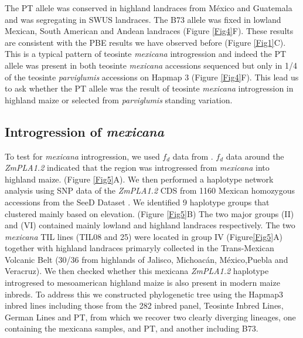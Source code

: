 \documentclass[9pt,twocolumn,twoside,lineno]{BioRxiv}
\begin{document}
The PT allele was conserved in highland landraces from México and Guatemala and was segregating in SWUS landraces. The B73 allele was fixed in lowland Mexican, South American and Andean landraces (Figure \ref{Fig4}F). 
These results are consistent with the PBE results we have observed before (Figure \ref{Fig1}C).
This is a typical pattern of teosinte \textit{mexicana} introgression \cite{Wang2020-mp} and indeed the PT allele was present in both teosinte \textit{mexicana} accessions sequenced but only in 1/4 of the teosinte \textit{parviglumis} accessions on Hapmap 3 \cite{Bukowski2017-ng} (Figure \ref{Fig4}F). 
This lead us to ask whether the PT allele was the result of teosinte \textit{mexicana} introgression in highland maize or selected from \textit{parviglumis} standing variation. 
\subsection{Introgression of \textit{mexicana}} 
To test for \textit{mexicana} introgression, we used \(f_d\) data from \cite{Gonzalez-Segovia2019-jy}.
\(f_d\) data around the \textit{ZmPLA1.2} indicated that the region was introgressed from \textit{mexicana} into highland maize. (Figure \ref{Fig5}A).
We then performed a haplotype network analysis using SNP data of the \textit{ZmPLA1.2} CDS from 1160 Mexican homozygous accessions from the SeeD Dataset \cite{Romero_Navarro2017-cn}. 
We identified 9 haplotype groups that clustered mainly based on elevation. (Figure \ref{Fig5}B) 
The two major groups (II) and (VI) contained mainly lowland and highland landraces respectively. 
The two \textit{mexicana} TIL lines (TIL08 and 25) were located in group IV  (Figure\ref{Fig5}A) together with highland landraces primaryly collected in the Trans-Mexican Volcanic Belt (30/36 from highlands of Jalisco, Michoacán, México,Puebla and Veracruz).
We then checked whether this mexicana \textit{ZmPLA1.2}  haplotype  introgresed to mesoamerican highland maize is also present in modern maize inbreds. 
To address this we constructed phylogenetic tree using the Hapmap3 inbred lines including those from the 282 inbred panel, Teosinte Inbred Lines, German Lines and PT, from which we recover two clearly diverging lineages, one containing the mexicana samples, and PT,  and another including B73.
\end{document}
